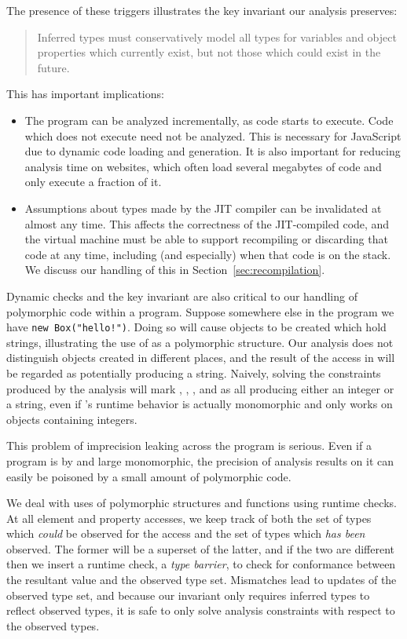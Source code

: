 The presence of these triggers illustrates the key invariant our analysis
preserves:
\begin{quote}
Inferred types must conservatively model all types for
variables and object properties which currently exist, but not those
which could exist in the future.
\end{quote}
This has important implications:

\begin{itemize}

\item The program can be analyzed incrementally, as code starts to execute.
Code which does not execute need not be analyzed.
This is necessary for JavaScript due to dynamic code loading
and generation. It is also important for reducing
analysis time on websites, which often load several megabytes of
code and only execute a fraction of it.

\item Assumptions about types made by the JIT compiler can be invalidated
at almost any time.
This affects the correctness of the JIT-compiled code, and the virtual machine
must be able to support recompiling or discarding that code at any time,
including (and especially) when that code is on the stack.
We discuss our handling of this in Section~\ref{sec:recompilation}.

\end{itemize}

Dynamic checks and the key invariant are also critical to our handling of polymorphic code
within a program. Suppose somewhere else in the program we have
\lstinline{new Box("hello!")}.
Doing so will cause  objects
to be created which hold strings,
illustrating the use of  as a polymorphic structure.
Our analysis does not distinguish  objects created in different
places, and the result of the  access in  will
be regarded as potentially producing a string.
Naively, solving the constraints produced by the analysis will mark
, , , and  as all producing
either an integer or a string, even if 's runtime behavior is actually monomorphic
and only works on  objects containing integers.

This problem of imprecision leaking across the program is serious. Even
if a program is by and large monomorphic, the precision of analysis results on
it can easily be poisoned by a small amount of polymorphic code.

We deal with uses of polymorphic structures and functions using runtime checks.
At all element and property accesses, we keep track of both the set of
types which \emph{could} be observed for the access and the set of types
which \emph{has been} observed.
The former will be a superset of the latter, and if the two are different then
we insert a runtime check, a {\it type barrier}, to check for conformance
between the resultant value and the observed type set.
Mismatches lead to updates of the observed type set, and because our
invariant only requires inferred types to reflect observed types, it is
safe to only solve analysis constraints with respect to the observed types.

